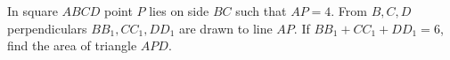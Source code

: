 In square $ABCD$ point $P$ lies on side $BC$ such that $AP=4$. From $B, C, D$ perpendiculars $BB_{1}, CC_{1}, DD_{1}$ are drawn to line $AP$. If $BB_{1}+CC_{1}+DD_{1}=6$, find the area of triangle $APD$.
